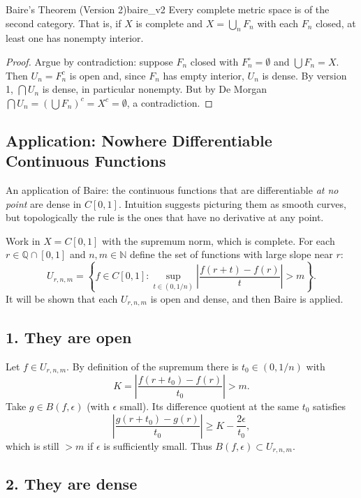 \documentclass[11pt, a4paper]{article}
\begin{document}
\begin{teorema}{Baire's Theorem (Version 2)}{baire_v2}
Every complete metric space is of the second category. That is, if $X$ is complete and $X = \bigcup_n F_n$
with each $F_n$ closed, at least one has nonempty interior.
\end{teorema}

\begin{proof}
Argue by contradiction: suppose $F_n$ closed with $F_n^\circ = \emptyset$ and $\bigcup F_n = X$. Then
$U_n = F_n^c$ is open and, since $F_n$ has empty interior, $U_n$ is dense. By version 1,
$\bigcap U_n$ is dense, in particular nonempty. But by De Morgan
$\bigcap U_n = (\bigcup F_n)^c = X^c = \emptyset$, a contradiction.
\end{proof}

\subsection{Application: Nowhere Differentiable Continuous Functions}

An application of Baire: the continuous functions that are differentiable \emph{at no point} are
dense in $C[0,1]$. Intuition suggests picturing them as smooth curves, but topologically the
rule is the ones that have no derivative at any point.

Work in $X = C[0,1]$ with the supremum norm, which is complete. For each
$r \in \mathbb{Q} \cap [0, 1]$ and $n, m \in \mathbb{N}$ define the set of functions with
large slope near $r$:
$$ U_{r,n,m} = \left\{ f \in C[0,1] : \sup_{t \in (0, 1/n)} \left| \frac{f(r+t) - f(r)}{t} \right| >
m \right\}. $$
It will be shown that each $U_{r,n,m}$ is open and dense, and then Baire is applied.

\subsection*{1. They are open}

Let $f \in U_{r,n,m}$. By definition of the supremum there is $t_0 \in (0, 1/n)$ with
$$ K = \left| \frac{f(r+t_0) - f(r)}{t_0} \right| > m. $$
Take $g \in B(f, \epsilon)$ (with $\epsilon$ small). Its difference quotient at the same $t_0$
satisfies
$$ \left| \frac{g(r+t_0) - g(r)}{t_0} \right| \ge K - \frac{2\epsilon}{t_0}, $$
which is still $> m$ if $\epsilon$ is sufficiently small. Thus $B(f, \epsilon) \subset U_{r,n,m}$.

\subsection*{2. They are dense}
\end{document}
